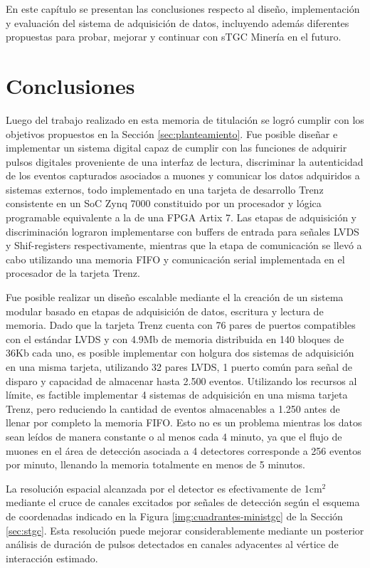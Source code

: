 En este capítulo se presentan las conclusiones respecto al diseño, implementación y evaluación del sistema de adquisición de datos, incluyendo además diferentes propuestas para probar, mejorar y continuar con sTGC Minería en el futuro.

\section{Conclusiones}
\label{sec:conc}

Luego del trabajo realizado en esta memoria de titulación se logró cumplir con los objetivos propuestos en la Sección \ref{sec:planteamiento}. Fue posible diseñar e implementar un sistema digital capaz de cumplir con las funciones de adquirir pulsos digitales proveniente de una interfaz de lectura, discriminar la autenticidad de los eventos capturados asociados a muones y comunicar los datos adquiridos a sistemas externos, todo implementado en una tarjeta de desarrollo Trenz consistente en un SoC Zynq 7000 constituido por un procesador y lógica programable equivalente a la de una FPGA Artix 7. Las etapas de adquisición y discriminación lograron implementarse con buffers de entrada para señales LVDS y Shif-registers respectivamente, mientras que la etapa de comunicación se llevó a cabo utilizando una memoria FIFO y comunicación serial implementada en el procesador de la tarjeta Trenz.

Fue posible realizar un diseño escalable mediante el la creación de un sistema modular basado en etapas de adquisición de datos, escritura y lectura de memoria. Dado que la tarjeta Trenz cuenta con 76 pares de puertos compatibles con el estándar LVDS y con 4.9Mb de memoria distribuida en 140 bloques de 36Kb cada uno, es posible implementar con holgura dos sistemas de adquisición en una misma tarjeta, utilizando 32 pares LVDS, 1 puerto común para señal de disparo y capacidad de almacenar hasta 2.500 eventos. Utilizando los recursos al límite, es factible implementar 4 sistemas de adquisición en una misma tarjeta Trenz, pero reduciendo la cantidad de eventos almacenables a 1.250 antes de llenar por completo la memoria FIFO. Esto no es un problema mientras los datos sean leídos de manera constante o al menos cada 4 minuto, ya que el flujo de muones en el área de detección asociada a 4 detectores corresponde a 256 eventos por minuto, llenando la memoria totalmente en menos de 5 minutos.

La resolución espacial alcanzada por el detector es efectivamente de 1cm$^2$ mediante el cruce de canales excitados por señales de detección según el esquema de coordenadas indicado en la Figura \ref{img:cuadrantes-ministgc} de la Sección \ref{sec:stgc}. Esta resolución puede mejorar considerablemente mediante un posterior análisis de duración de pulsos detectados en canales adyacentes al vértice de interacción estimado. 

